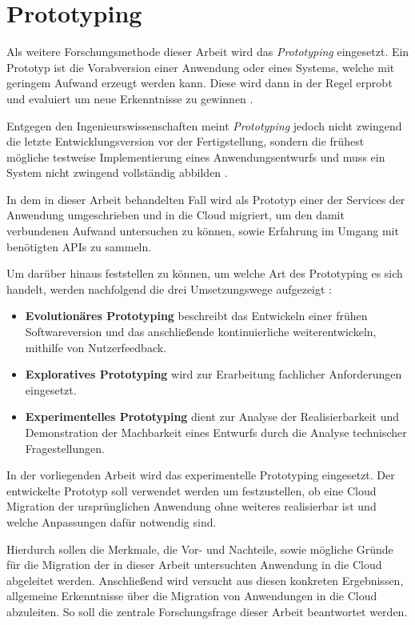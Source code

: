 \section{Prototyping}

Als weitere Forschungsmethode dieser Arbeit wird das \textit{Prototyping} eingesetzt. Ein Prototyp ist die Vorabversion einer Anwendung oder eines Systems, welche mit geringem Aufwand erzeugt werden kann. Diese wird dann in der Regel erprobt und evaluiert um neue Erkenntnisse zu gewinnen \cite[Vgl.][S. 282]{Wilde2007}\cite[Vgl.][S. 114]{Heinrich2011}.

Entgegen den Ingenieurswissenschaften meint \textit{Prototyping} jedoch nicht zwingend die letzte Entwicklungsversion vor der Fertigstellung, sondern die frühest mögliche testweise Implementierung eines Anwendungsentwurfs \cite[Vgl.][S. 114]{Heinrich2011} und muss ein System nicht zwingend vollständig abbilden \cite[Vgl.][S. 119]{Heinrich2011}.

In dem in dieser Arbeit behandelten Fall wird als Prototyp einer der Services der \mbox{Anwendung} umgeschrieben und in die Cloud migriert, um den damit verbundenen Aufwand untersuchen zu können, sowie Erfahrung im Umgang mit benötigten \acp{API} zu sammeln. \pagebreak

Um darüber hinaus feststellen zu können, um welche Art des Prototyping es sich handelt, werden nachfolgend die drei Umsetzungswege aufgezeigt \cite[Vgl. auch im Folgenden][S. 370]{Alpar2019}:
\begin{itemize}
    \item \textbf{Evolutionäres Prototyping} beschreibt das Entwickeln einer frühen Softwareversion und das anschließende kontinuierliche weiterentwickeln, mithilfe von Nutzerfeedback.
    \item \textbf{Exploratives Prototyping} wird zur Erarbeitung fachlicher Anforderungen eingesetzt.
    \item \textbf{Experimentelles Prototyping} dient zur Analyse der Realisierbarkeit und Demonstration der Machbarkeit eines Entwurfs durch die Analyse technischer Fragestellungen.
\end{itemize}

In der vorliegenden Arbeit wird das experimentelle Prototyping eingesetzt. Der entwickelte Prototyp soll verwendet werden um festzustellen, ob eine Cloud Migration der ursprünglichen Anwendung ohne weiteres realisierbar ist und welche Anpassungen dafür notwendig sind.

Hierdurch sollen die Merkmale, die Vor- und Nachteile, sowie mögliche Gründe für die Migration der in dieser Arbeit untersuchten Anwendung in die Cloud abgeleitet werden. Anschließend wird versucht aus diesen konkreten Ergebnissen, allgemeine Erkenntnisse über die Migration von Anwendungen in die Cloud abzuleiten. So soll die zentrale Forschungsfrage dieser Arbeit beantwortet werden. \pagebreak
